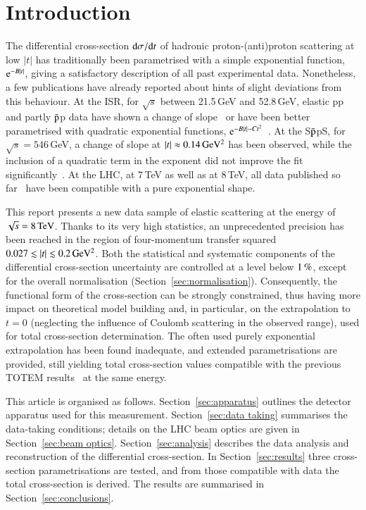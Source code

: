 \section{Introduction}
%
The differential cross-section ${\rm d} \sigma/{\rm d} t$ of hadronic proton-(anti)proton 
scattering at low $|t|$ has traditionally been parametrised with a simple 
exponential function, ${\rm e}^{-B |t|}$, giving a satisfactory description of 
all past experimental data.
Nonetheless, a few publications have already reported about hints of
slight deviations from this behaviour. At the ISR, for $\sqrt{s}$ 
between 21.5\,GeV and 52.8\,GeV, elastic pp and partly $\rm\bar{p}$p data have shown a 
change of slope~\cite{plb39,plb115} or have been better parametrised with quadratic 
exponential functions, ${\rm e}^{-B |t|-C t^2}$~\cite{npb141,npb248}. 
At the S$\rm\bar{p}$pS, for 
$\sqrt{s} = 546\,$GeV, a change of slope at $|t| \approx 0.14\,\rm GeV^{2}$ 
has been observed, while the inclusion of a quadratic term in the exponent did
not improve the fit significantly~\cite{plb147}.
At the LHC, at 7\,TeV as well as at 8\,TeV, all data published so 
far~\cite{epl96,epl101-el,prl111,alfa} have been
compatible with a pure exponential shape.

This report presents a new data sample of elastic scattering at the energy of $\sqrt s = 8\,{\rm TeV}$. Thanks to its very high statistics,
an unprecedented precision has been reached in the region of four-momentum transfer squared $0.027 \lesssim |t| \lesssim 0.2\,{\rm GeV^2}$. Both the statistical and systematic components of the differential cross-section uncertainty are controlled 
at a level below $1\,{\rm \%}$, except for the overall normalisation 
(Section~\ref{sec:normalisation}). Consequently, the functional form of the cross-section can be strongly constrained, thus having more impact on theoretical model building and, in particular, on the extrapolation to $t=0$ (neglecting the influence of Coulomb scattering in the observed range), used for total cross-section determination. The often used purely exponential extrapolation has been found inadequate, and extended parametrisations are provided, still yielding total cross-section values compatible with the previous TOTEM results~\cite{prl111} at the same energy.

This article is organised as follows. Section~\ref{sec:apparatus} outlines the detector apparatus used for this measurement. Section~\ref{sec:data taking} summarises the data-taking conditions; details on the LHC beam optics are given in Section~\ref{sec:beam optics}. Section~\ref{sec:analysis} describes the data analysis and reconstruction of the differential cross-section. In Section~\ref{sec:results} three cross-section parametrisations are tested, and from those compatible with data the total cross-section is derived. The results are summarised in Section~\ref{sec:conclusions}.
